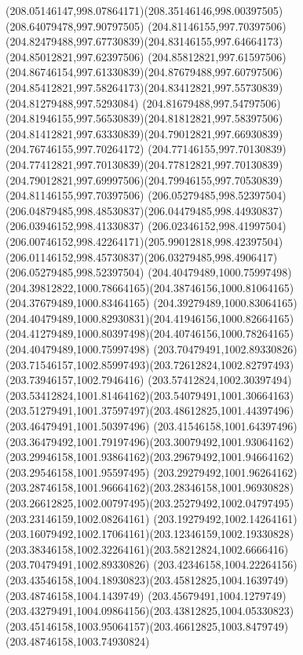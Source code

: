 {{		\curveto(208.05146147,998.07864171)(208.35146146,998.00397505)(208.64079478,997.90797505)
		\moveto(204.81146155,997.70397506)
		\curveto(204.82479488,997.67730839)(204.83146155,997.64664173)(204.85012821,997.62397506)
		\curveto(204.85812821,997.61597506)(204.86746154,997.61330839)(204.87679488,997.60797506)
		\curveto(204.85412821,997.58264173)(204.83412821,997.55730839)(204.81279488,997.5293084)
		\curveto(204.81679488,997.54797506)(204.81946155,997.56530839)(204.81812821,997.58397506)
		\curveto(204.81412821,997.63330839)(204.79012821,997.66930839)(204.76746155,997.70264172)
		\curveto(204.77146155,997.70130839)(204.77412821,997.70130839)(204.77812821,997.70130839)
		\curveto(204.79012821,997.69997506)(204.79946155,997.70530839)(204.81146155,997.70397506)
		\moveto(206.05279485,998.52397504)
		\curveto(206.04879485,998.48530837)(206.04479485,998.44930837)(206.03946152,998.41330837)
		\curveto(206.02346152,998.41997504)(206.00746152,998.42264171)(205.99012818,998.42397504)
		\curveto(206.01146152,998.45730837)(206.03279485,998.4906417)(206.05279485,998.52397504)
		\moveto(204.40479489,1000.75997498)
		\curveto(204.39812822,1000.78664165)(204.38746156,1000.81064165)(204.37679489,1000.83464165)
		\curveto(204.39279489,1000.83064165)(204.40479489,1000.82930831)(204.41946156,1000.82664165)
		\curveto(204.41279489,1000.80397498)(204.40746156,1000.78264165)(204.40479489,1000.75997498)
		\moveto(203.70479491,1002.89330826)
		\curveto(203.71546157,1002.85997493)(203.72612824,1002.82797493)(203.73946157,1002.7946416)
		\curveto(203.57412824,1002.30397494)(203.53412824,1001.81464162)(203.54079491,1001.30664163)
		\curveto(203.51279491,1001.37597497)(203.48612825,1001.44397496)(203.46479491,1001.50397496)
		\curveto(203.41546158,1001.64397496)(203.36479492,1001.79197496)(203.30079492,1001.93064162)
		\curveto(203.29946158,1001.93864162)(203.29679492,1001.94664162)(203.29546158,1001.95597495)
		\curveto(203.29279492,1001.96264162)(203.28746158,1001.96664162)(203.28346158,1001.96930828)
		\curveto(203.26612825,1002.00797495)(203.25279492,1002.04797495)(203.23146159,1002.08264161)
		\curveto(203.19279492,1002.14264161)(203.16079492,1002.17064161)(203.12346159,1002.19330828)
		\curveto(203.38346158,1002.32264161)(203.58212824,1002.6666416)(203.70479491,1002.89330826)
		\moveto(203.42346158,1004.22264156)
		\curveto(203.43546158,1004.18930823)(203.45812825,1004.1639749)(203.48746158,1004.1439749)
		\curveto(203.45679491,1004.1279749)(203.43279491,1004.09864156)(203.43812825,1004.05330823)
		\curveto(203.45146158,1003.95064157)(203.46612825,1003.8479749)(203.48746158,1003.74930824)
}}
